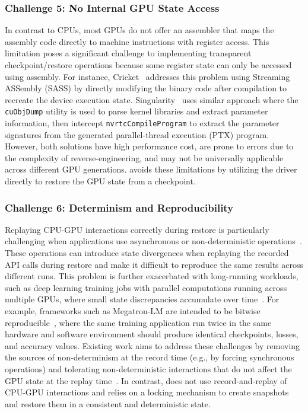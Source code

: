 \subsubsection*{Challenge 5: No Internal GPU State Access}%
In contrast to CPUs, most GPUs do not offer an assembler that maps the assembly code directly to machine instructions with register access. This limitation poses a significant challenge to implementing transparent checkpoint/restore operations because some register state can only be accessed using assembly. For instance, Cricket~\cite{eiling2022cricket} addresses this problem using Streaming ASSembly (SASS) by directly modifying the binary code after compilation to recreate the device execution state. Singularity~\cite{sivathanu2022transparent} uses similar approach where the \texttt{cuObjDump} utility is used to parse kernel libraries and extract parameter information, then intercept \texttt{nvrtcCompileProgram} to extract the parameter signatures from the generated parallel-thread execution (PTX) program. However, both solutions have high performance cost, are prone to errors due to the complexity of reverse-engineering, and may not be universally applicable across different GPU generations. \sys avoids these limitations by utilizing the driver directly to restore the GPU state from a checkpoint. 

\subsubsection*{Challenge 6: Determinism and Reproducibility}%
Replaying CPU-GPU interactions correctly during restore is particularly challenging when applications use asynchronous or non-deterministic operations~\cite{park2022gpureplay}.
These operations can introduce state divergences when replaying the recorded API calls during restore and make it difficult to reproduce the same results across different runs.
This problem is further exacerbated with long-running workloads, such as deep learning training jobs with parallel computations running across multiple GPUs, where small state discrepancies accumulate over time~\cite{riachnvidia2019gtc}. For example, frameworks such as Megatron-LM are intended to be bitwise reproducible~\cite{nvidia2024megatron-lm}, where the same training application run twice in the same hardware and software environment should produce identical checkpoints, losses, and accuracy values.
Existing work aims to address these challenges by removing the sources of non-determinism at the record time (e.g., by forcing synchronous operations) and tolerating non-deterministic interactions that do not affect the GPU state at the replay time~\cite{park2022gpureplay,gupta2024just}.
In contrast, \sys does not use record-and-replay of CPU-GPU interactions and relies on a locking mechanism to create snapshots and restore them in a consistent and deterministic state.

